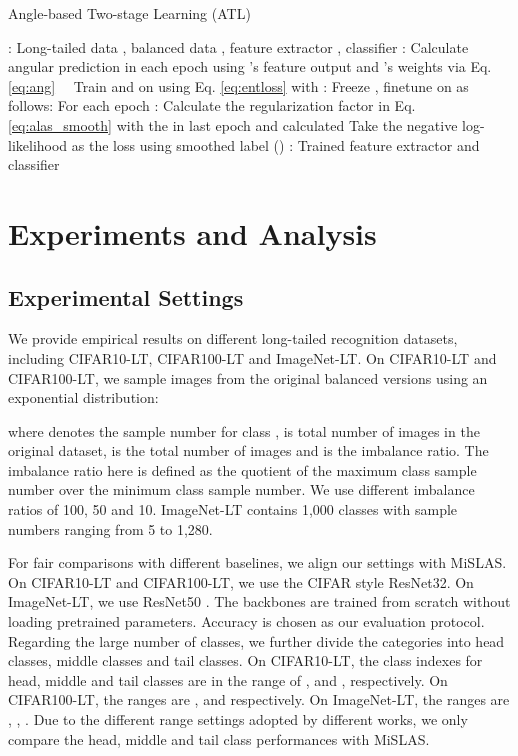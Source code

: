 \documentclass[10pt,twocolumn,letterpaper]{article}
\begin{document}
\begin{algorithm}[t]
\caption{Angle-based Two-stage Learning (ATL)}
\label{alg:framework}
\begin{small}
\begin{algorithmic}[1]
: Long-tailed data , balanced data , feature extractor , classifier 
: Calculate angular prediction  in each epoch using 's feature output and 's weights via Eq. \ref{eq:ang}
\STATE  \qquad \qquad \ \ Train  and  on  using Eq. \ref{eq:entloss} with 
: Freeze , finetune  on  as follows:
\STATE  \qquad For each epoch :
\STATE  \qquad \qquad Calculate the regularization factor  in Eq. \ref{eq:alas_smooth} with the  in last epoch and calculated 
\STATE  \qquad \qquad Take the negative log-likelihood as the loss using 
\qquad  \qquad \quad smoothed label ()
: Trained feature extractor  and classifier 
\end{algorithmic}
\end{small}
\end{algorithm}

\section{Experiments and Analysis}
\subsection{Experimental Settings}
We provide empirical results on different long-tailed recognition datasets, including CIFAR10-LT, CIFAR100-LT and ImageNet-LT. On CIFAR10-LT and CIFAR100-LT, we sample images from the original balanced versions \cite{cifar100} \cite{imagenet} using an exponential distribution:

where  denotes the sample number for class ,  is total number of images in the original dataset,  is the total number of images and  is the imbalance ratio. The imbalance ratio here is defined as the quotient of the maximum class sample number over the minimum class sample number. We use different imbalance ratios  of 100, 50 and 10. ImageNet-LT contains 1,000 classes with sample numbers ranging from 5 to 1,280. 

For fair comparisons with different baselines, we align our settings with MiSLAS. On CIFAR10-LT and CIFAR100-LT, we use the CIFAR style ResNet32. On ImageNet-LT, we use ResNet50 \cite{resnet}. The backbones are trained from scratch without loading pretrained parameters. Accuracy is chosen as our evaluation protocol. Regarding the large number of classes, we further divide the categories into head classes, middle classes and tail classes. On CIFAR10-LT, the class indexes for head, middle and tail classes are in the range of ,  and , respectively. On CIFAR100-LT, the ranges are ,  and  respectively. On ImageNet-LT, the ranges are , , . Due to the different range settings adopted by different works, we only compare the head, middle and tail class performances with MiSLAS. 
\end{document}
